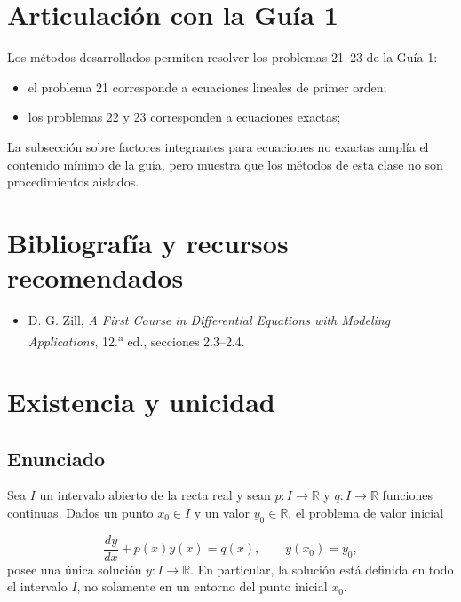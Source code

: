 \documentclass[12pt,a4paper]{article}
\begin{document}
	\section*{Articulación con la Guía 1}

	Los métodos desarrollados permiten resolver los problemas 21--23 de la Guía 1:

	\begin{itemize}[leftmargin=*]
		\item el problema 21 corresponde a ecuaciones lineales de primer orden;
		\item los problemas 22 y 23 corresponden a ecuaciones exactas;
	\end{itemize}

	La subsección sobre factores integrantes para ecuaciones no exactas amplía el contenido mínimo de la guía, pero muestra que los métodos de esta clase no son procedimientos aislados.

	\section*{Bibliografía y recursos recomendados}

	\begin{itemize}[leftmargin=*]
		\item D. G. Zill, \textit{A First Course in Differential Equations with Modeling Applications}, 12.\textsuperscript{a} ed., secciones 2.3--2.4.
	\end{itemize}

	\clearpage
	\appendix
	\section{Existencia y unicidad}
	\label{ap:existencia-unicidad-lineales}

	\subsection{Enunciado}

	Sea \(I\) un intervalo abierto de la recta real y sean \(p:I\to\mathbb{R}\) y \(q:I\to\mathbb{R}\) funciones continuas. Dados un punto \(x_0\in I\) y un valor \(y_0\in\mathbb{R}\), el problema de valor inicial

	\[
	\frac{dy}{dx}+p(x)y(x)=q(x),
	\qquad
	y(x_0)=y_0,
	\]
	posee una única solución \(y:I\to\mathbb{R}\). En particular, la solución está definida en todo el intervalo \(I\), no solamente en un entorno del punto inicial \(x_0\).
\end{document}
